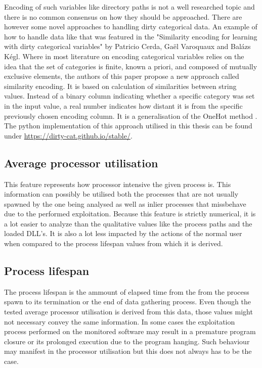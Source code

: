 \documentclass[a4paper,twoside,12pt]{book}
\begin{document}
Encoding of such variables like directory paths is not a well researched topic and there is no 
common consensus on how they should be approached. There are however some novel approaches to 
handling dirty categorical data. An example of how to handle data like that was featured in the 
"Similarity encoding for learning with dirty categorical variables" by Patricio Cerda,  Ga{\"e}l 
Varoquaux and Bal{\'a}zs K{\'e}gl. Where in most literature on encoding categorical variables 
relies on the idea that the set of categories is finite, known a priori, and composed of mutually 
exclusive elements, the authors of this paper propose a new approach called similarity encoding. 
It is based on calculation of similarities between string values. Instead of a binary column 
indicating whether a specific category was set in the input value, a real number indicates how 
distant it is from the specific previously chosen encoding column. It is a generalisation of the 
OneHot method \cite{bib:dirtycat}. The python implementation of this approach utilised in this thesis 
can be found under \url{https://dirty-cat.github.io/stable/}.


\subsection{Average processor utilisation}

This feature represents how processor intensive the given process is. This information can possibly 
be utilised both the processes that are not usually spawned by the one being analysed as well as
inlier processes that missbehave due to the performed exploitation. Because this feature is 
strictly numerical, it is a lot easier to analyze than the qualitative values like the process
paths and the loaded DLL's. It is also a lot less impacted by the actions of the normal user when
compared to the process lifespan values from which it is derived.

\subsection{Process lifespan}
The process lifespan is the ammount of elapsed time from the from the process spawn to its
termination or the end of data gathering process. Even though the tested average processor utilisation 
is derived from this data, those values might not necessary convey the same information. In some cases
the exploitation process performed on the monitored software may result in a premature program
closure or its prolonged execution due to the program hanging. Such behaviour may manifest in the
processor utilisation but this does not always has to be the case. 
\end{document}
